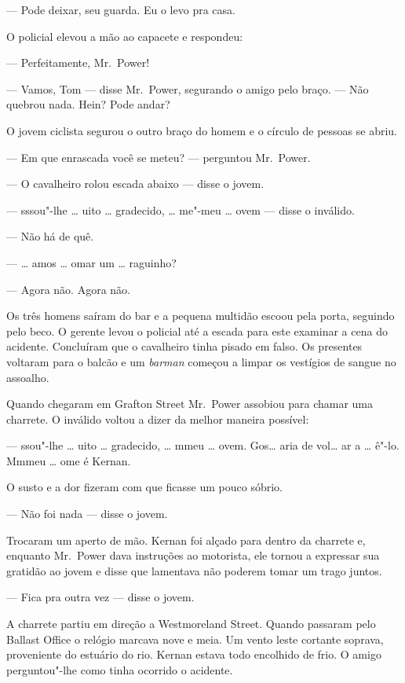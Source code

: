 --- Pode deixar, seu guarda.  Eu o levo pra casa.

O policial elevou a mão ao capacete e respondeu:

--- Perfeitamente, Mr.~Power!

--- Vamos, Tom --- disse Mr.~Power, segurando o amigo pelo braço.  --- Não
quebrou nada.  Hein?  Pode andar?

O jovem ciclista segurou o outro braço do homem e o círculo de pessoas se
abriu.

--- Em que enrascada você se meteu? --- perguntou Mr.~Power.

--- O cavalheiro rolou escada abaixo --- disse o jovem.

--- sssou"-lhe \ldots{} uito \ldots{} gradecido, \ldots{} me"-meu \ldots{} ovem ---
disse o inválido.

--- Não há de quê.

--- \ldots{} amos \ldots{} omar um \ldots{} raguinho?

--- Agora não.  Agora não.

Os três homens saíram do bar e a pequena multidão escoou pela porta, seguindo
pelo beco.  O gerente levou o policial até a escada para este examinar a cena
do acidente.  Concluíram que o cavalheiro tinha pisado em falso.  Os presentes
voltaram para o balcão e um \textit{barman} começou a limpar os vestígios de
sangue no assoalho.

Quando chegaram em Grafton Street Mr.~Power assobiou para chamar uma charrete.
O inválido voltou a dizer da melhor maneira possível:

--- ssou"-lhe \ldots{} uito \ldots{} gradecido, \ldots{} mmeu \ldots{} ovem.
Gos\ldots{} aria de vol\ldots{} ar a \ldots{} ê"-lo.  Mmmeu \ldots{} ome é Kernan.

O susto e a dor fizeram com que ficasse um pouco sóbrio.

--- Não foi nada --- disse o jovem.

Trocaram um aperto de mão.  Kernan foi alçado para dentro da charrete e,
enquanto Mr.~Power dava instruções ao motorista, ele tornou a expressar sua
gratidão ao jovem e disse que lamentava não poderem tomar um trago juntos.

--- Fica pra outra vez --- disse o jovem.

A charrete partiu em direção a Westmoreland Street.  Quando passaram pelo
Ballast Office o relógio marcava nove e meia.  Um vento leste cortante soprava,
proveniente do estuário do rio.  Kernan estava todo encolhido de frio.  O amigo
perguntou"-lhe como tinha ocorrido o acidente.


